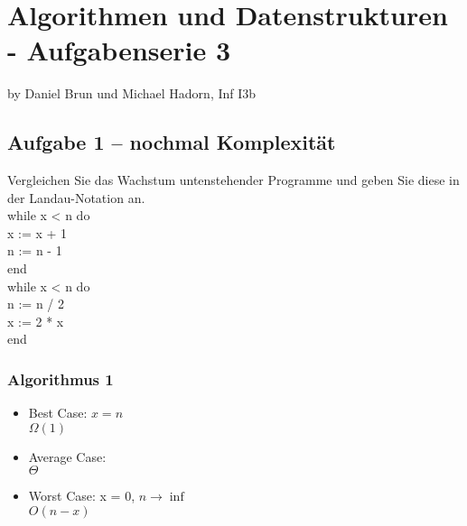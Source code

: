 
\chapter*{Algorithmen und Datenstrukturen - Aufgabenserie 3}
\begin{flushright}
by Daniel Brun und Michael Hadorn, Inf I3b
\end{flushright}
\section*{Aufgabe 1 – nochmal Komplexität}

Vergleichen Sie das Wachstum untenstehender Programme und geben Sie diese in der Landau-Notation an.\\


while x < n do\\
	x := x + 1\\
	n := n - 1\\	
end\\


while x < n do\\
	n := n / 2\\
	x := 2 * x\\
end\\

\subsection*{Algorithmus 1}
\begin{itemize}
	\item Best Case:  $x = n$ \\
		  $\Omega(1)$
	\item Average Case: \\
		  $\Theta$
	\item Worst Case: x = 0, $n \rightarrow \inf$ \\
		  $O(n-x)$
\end{itemize}


